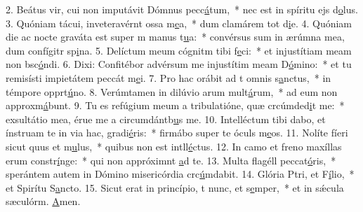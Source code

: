 2. Beátus vir, cui non imputávit Dómnus pecc\uline{á}tum,~* nec est in spíritu ejs d\uline{o}lus.
3. Quóniam tácui, inveteravérnt ossa m\uline{e}a,~* dum clamárem tot d\uline{i}e.
4. Quóniam die ac nocte graváta est super m manus t\uline{u}a:~* convérsus sum in ærúmna mea, dum confígitr sp\uline{i}na.
5. Delíctum meum cógnitm tibi f\uline{e}ci:~* et injustítiam meam non bsc\uline{ó}ndi.
6. Dixi: Confitébor advérsum me injustítim meam D\uline{ó}mino:~* et tu remisísti impietátem peccát m\uline{e}i.
7. Pro hac orábit ad t omnis s\uline{a}nctus,~* in témpore opprt\uline{ú}no.
8. Verúmtamen in dilúvio arum mult\uline{á}rum,~* ad eum non approxm\uline{á}bunt.
9. Tu es refúgium meum a tribulatióne, quæ crcúmded\uline{i}t me:~* exsultátio mea, érue me a circumdántb\uline{u}s me.
10. Intelléctum tibi dabo, et ínstruam te in via hac,  gradi\uline{é}ris:~* firmábo super te óculs m\uline{e}os.
11. Nolíte fíeri sicut quus et m\uline{u}lus,~* quibus non est intll\uline{é}ctus.
12. In camo et freno maxíllas erum constr\uline{í}nge:~* qui non appróximnt \uline{a}d te.
13. Multa flagéll peccat\uline{ó}ris,~* sperántem autem in Dómino misericórdia crc\uline{ú}mdabit.
14. Glória Ptri, et F\uline{í}lio,~* et Spirítu S\uline{a}ncto.
15. Sicut erat in princípio, t nunc, et s\uline{e}mper,~* et in sǽcula sæculórm. \uline{A}men.
